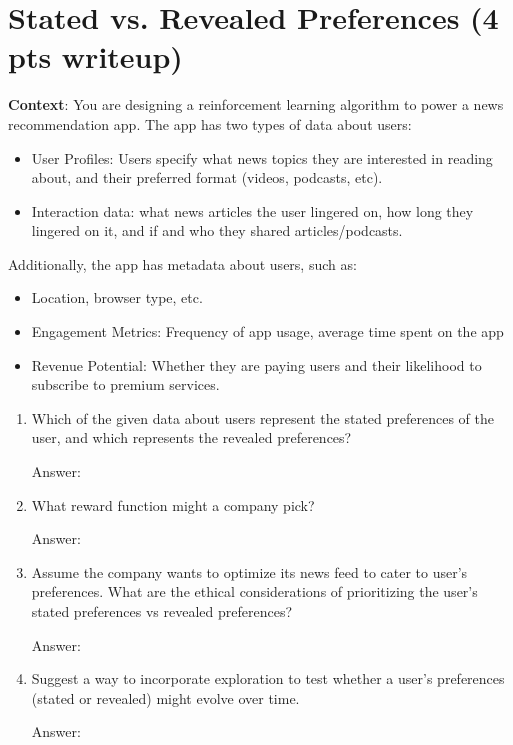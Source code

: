\documentclass{article}
\newcommand{\answer}[1]{
    \begin{tcolorbox}[breakable]
    Answer: #1
    \end{tcolorbox}
    \clearpage
}
\begin{document}
\begin{enumerate}
{    %
    }

\end{enumerate}

\section{Stated vs. Revealed Preferences (4 pts writeup)}


\textbf{Context}: You are designing a reinforcement learning algorithm to power a news recommendation app. The app has two types of data about users:

\begin{itemize}
    \item User Profiles: Users specify what news topics they are interested in reading about, and their preferred format (videos, podcasts, etc). 
    \item Interaction data: what news articles the user lingered on, how long they lingered on it, and if and who they shared articles/podcasts.
\end{itemize}

Additionally, the app has metadata about users, such as:
\begin{itemize}
    \item Location, browser type, etc.
    \item Engagement Metrics: Frequency of app usage, average time spent on the app
    \item Revenue Potential: Whether they are paying users and their likelihood to subscribe to premium services.
\end{itemize}


\begin{enumerate}
    \item[(a)]  Which of the given data about users represent the stated preferences of the user, and which represents the  revealed preferences?
    \answer{

    }

    \item[(b)] What reward function might a company pick?
    \answer{

    }

    \item[(c)] Assume the company wants to optimize its news feed to cater to user’s preferences.  What are the ethical considerations of prioritizing the user's stated preferences vs revealed preferences? 
    \answer{

    }

    \item[(d)] Suggest a way to incorporate exploration  to test whether a user’s preferences (stated or revealed) might evolve over time. 
    \answer{

    }

\end{enumerate}
\end{document}
